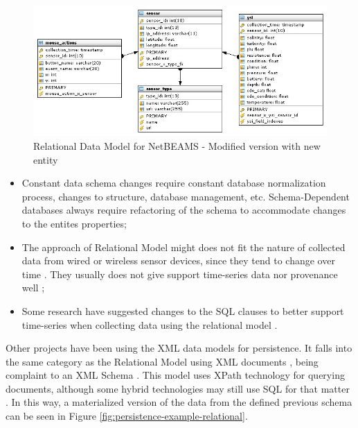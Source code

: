 \begin{figure}
  \centering
  \includegraphics[scale=0.5]{../diagrams/Relational-Model-Addition-Modified}
  \caption{Relational Data Model for NetBEAMS - Modified version with new
  entity}
  \label{fig:Relational-Model-Addition-Modified}
\end{figure}

\begin{itemize}
  \item Constant data schema changes require constant database normalization
  process, changes to structure, database management, etc. Schema-Dependent 
  databases always require refactoring of the schema to accommodate changes to
  the entites properties;
  \item The approach of Relational Model might does not fit the nature of
  collected data from wired or wireless sensor devices, since they tend to
  change over time \cite{db-is-rdbs-dommed}. They usually does not give
  support time-series data nor provenance well \cite{sn-provenance};
  \item Some research have suggested changes to the SQL clauses to better
  support time-series when collecting data using the relational model 
  \cite{sn-db-newop}.
\end{itemize}

Other projects have been using the XML data models for persistence. It falls
into the same category as the Relational Model using XML documents \cite{xml},
being complaint to an XML Schema \cite{xml-schema}. This model uses XPath
\cite{xml-xpath} technology for querying documents, although some hybrid
technologies may still use SQL \cite{sql} for that matter \cite{db2}. In this
way, a materialized version of the data from the defined previous schema can be
seen in Figure \ref{fig:persistence-example-relational}.

